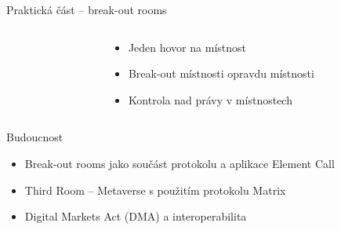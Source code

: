 \documentclass[aspectratio=169]{beamer}
\begin{document}
\begin{frame}{Praktická část -- break-out rooms}
    \pause
    \begin{columns}[T]
        \begin{column}{0.5\textwidth}
        \end{column}
        \begin{column}{0.5\textwidth}
            \begin{itemize}[<+->]
                \item Jeden hovor na místnost
                \item Break-out místnosti opravdu místnosti
                \item Kontrola nad právy v místnostech
            \end{itemize}
        \end{column}
    \end{columns}
\end{frame}
\begin{frame}{Budoucnost}
    \pause
    \begin{itemize}[<+->]
        \item Break-out rooms jako součást protokolu a aplikace Element Call
        \item Third Room -- Metaverse s použitím protokolu Matrix
        \item Digital Markets Act (DMA) a interoperabilita
    \end{itemize}
\end{frame}
\end{document}

